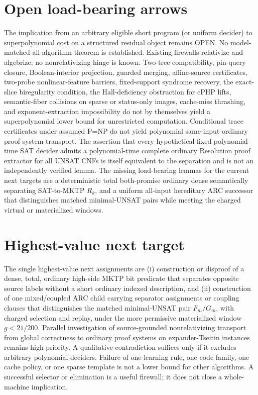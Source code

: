 \documentclass[11pt]{article}
\begin{document}
\section{Open load-bearing arrows}
The implication from an arbitrary eligible short program (or uniform decider) to superpolynomial cost on a structured residual object remains OPEN. No model-matched all-algorithm theorem is established. Existing firewalls relativize and algebrize; no nonrelativizing hinge is known. Two-tree compatibility, pin-query closure, Boolean-interior projection, guarded merging, affine-source certificates, two-probe nonlinear-feature barriers, fixed-support syndrome recovery, the exact-slice biregularity condition, the Hall-deficiency obstruction for cPHP lifts, semantic-fiber collisions on sparse or status-only images, cache-miss thrashing, and exponent-extraction impossibility do not by themselves yield a superpolynomial lower bound for unrestricted computation. Conditional trace certificates under assumed P=NP do not yield polynomial same-input ordinary proof-system transport. The assertion that every hypothetical fixed polynomial-time SAT decider admits a polynomial-time complete ordinary Resolution proof extractor for all UNSAT CNFs is itself equivalent to the separation and is not an independently verified lemma. The missing load-bearing lemmas for the current next targets are a deterministic total both-promise ordinary dense semantically separating SAT-to-MKTP \(R_k\), and a uniform all-input hereditary ARC successor that distinguishes matched minimal-UNSAT pairs while meeting the charged virtual or materialized windows.

\section{Highest-value next target}
The single highest-value next assignments are (i) construction or disproof of a dense, total, ordinary high-side MKTP bit predicate that separates opposite source labels without a short ordinary indexed description, and (ii) construction of one mixed/coupled ARC child carrying separator assignments or coupling clauses that distinguishes the matched minimal-UNSAT pair \(F_m/G_m\), with charged selection and replay, under the more permissive materialized window \(g<21/200\). Parallel investigation of source-grounded nonrelativizing transport from global correctness to ordinary proof systems on expander-Tseitin instances remains high priority. A qualitative contradiction suffices only if it excludes arbitrary polynomial deciders. Failure of one learning rule, one code family, one cache policy, or one sparse template is not a lower bound for other algorithms. A successful selector or elimination is a useful firewall; it does not close a whole-machine implication.
\end{document}
